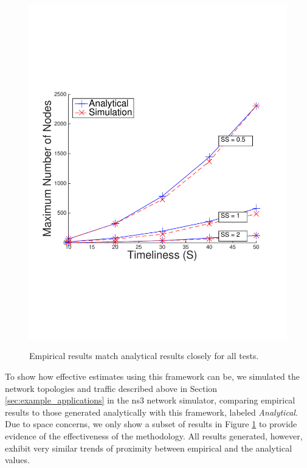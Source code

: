\begin{figure}[]
{        \includegraphics[scale=0.20, clip=true, trim=12mm 65mm 20mm 65mm]{figures/scal_sim_results/color_2d/grid_uni_2d_qoi_vs_non_color_multiple.pdf}
        \label{fig:scal_vs_qoi_grid}
        }
   \caption{Empirical results match analytical results closely for all tests.}
   \label{fig:scal_vs_qoi}
\vspace{-6mm}
\end{figure}

To show how effective estimates using this framework can be, we simulated the network topologies and traffic described above in Section \ref{sec:example_applications} in the ns3 network simulator, comparing empirical results to those generated analytically with this framework, labeled \emph{Analytical}.  Due to space concerns, we only show a subset of results in Figure \ref{fig:scal_vs_qoi} to provide evidence of the effectiveness of the methodology.  All results generated, however, exhibit very similar trends of proximity between empirical and the analytical values.


